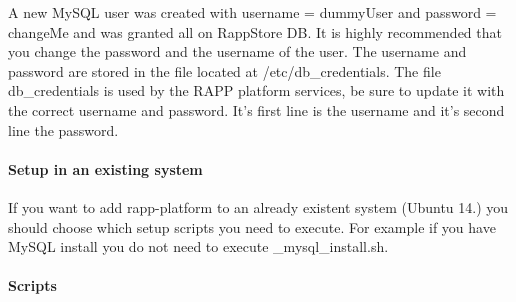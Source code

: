 A new My\-S\-Q\-L user was created with username = {\ttfamily dummy\-User} and password = {\ttfamily change\-Me} and was granted all on Rapp\-Store D\-B. It is highly recommended that you change the password and the username of the user. The username and password are stored in the file located at /etc/db\-\_\-credentials. The file db\-\_\-credentials is used by the R\-A\-P\-P platform services, be sure to update it with the correct username and password. It's first line is the username and it's second line the password.

\paragraph*{Setup in an existing system}

If you want to add rapp-\/platform to an already existent system (Ubuntu 14.) you should choose which setup scripts you need to execute. For example if you have My\-S\-Q\-L install you do not need to execute {\-\_\-mysql\-\_\-install.\-sh}.

\paragraph*{Scripts}


